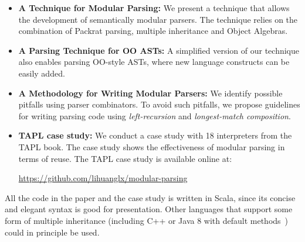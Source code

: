 \begin{itemize}[leftmargin=*]

\item \textbf{A Technique for Modular Parsing:}
  We present a technique that allows the development of semantically modular parsers.
  The technique relies on the combination of Packrat parsing, multiple inheritance
  and Object Algebras.

\item \textbf{A Parsing Technique for OO ASTs:} A simplified version of
  our technique also enables parsing OO-style ASTs, where new language
  constructs can be easily added.

\item \textbf{A Methodology for Writing Modular Parsers:} We
  identify possible pitfalls using parser combinators. To avoid such
  pitfalls, we propose guidelines for writing parsing code using
  \emph{left-recursion} and \emph{longest-match composition}.

\item \textbf{TAPL case study:} We conduct a case study with 18 interpreters
  from the TAPL book. The case study shows the effectiveness of modular
  parsing in terms of reuse. The TAPL case study is available online
  at:

  \url{https://github.com/lihuanglx/modular-parsing}

\end{itemize}

All the code in the paper and the case study is written in Scala, since its concise and elegant
syntax is good for presentation. Other languages that support some form of multiple inheritance
(including C++ or Java 8 with default methods~\cite{Goetz2012}) could in principle be
used.

